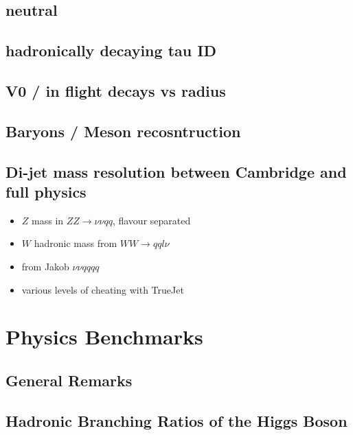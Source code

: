 \subsection{neutral}
\subsection{hadronically decaying tau ID}
\subsection{V0 / in flight decays vs radius}
\subsection{Baryons / Meson recosntruction}
\subsection{Di-jet mass resolution between Cambridge and full physics}
\begin{itemize}
\item $Z$ mass in $ZZ \to \nu\nu qq$, flavour separated
\item $W$ hadronic mass from $WW \to qq l\nu$
\item from Jakob $\nu\nu qqqq$
\item various levels of cheating with TrueJet
\end{itemize}


\section{Physics Benchmarks}
\subsection{General Remarks}
\subsection{Hadronic Branching Ratios of the Higgs Boson}
